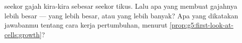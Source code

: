 \begin{exercise}[$\star\star\star$]\label{exo:g5:first-look-at-cells:11}
 seekor gajah kira-kira sebesar  seekor tikus. Lalu apa yang
membuat gajahnya lebih besar ---  yang lebih besar, atau  yang
lebih banyak? Apa yang dikatakan jawabanmu tentang cara kerja
pertumbuhan, menurut \cref{prop:g5:first-look-at-cells:growth}?
\end{exercise}
